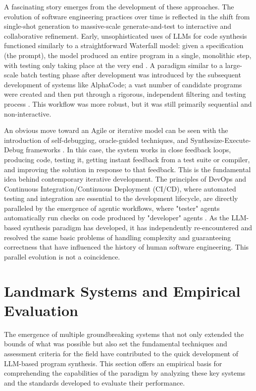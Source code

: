 \documentclass[12pt, a4paper]{report}
\begin{document}
A fascinating story emerges from the development of these approaches. The evolution of software engineering practices over time is reflected in the shift from single-shot generation to massive-scale generate-and-test to interactive and collaborative refinement. Early, unsophisticated uses of LLMs for code synthesis functioned similarly to a straightforward Waterfall model: given a specification (the prompt), the model produced an entire program in a single, monolithic step, with testing only taking place at the very end \citep{chen2021evaluating}. A paradigm similar to a large-scale batch testing phase after development was introduced by the subsequent development of systems like AlphaCode; a vast number of candidate programs were created and then put through a rigorous, independent filtering and testing process \citep{li2022competition}. This workflow was more robust, but it was still primarily sequential and non-interactive.

An obvious move toward an Agile or iterative model can be seen with the introduction of self-debugging, oracle-guided techniques, and Synthesize-Execute-Debug frameworks \citep{shinn2023reflexion}. In this case, the system works in close feedback loops, producing code, testing it, getting instant feedback from a test suite or compiler, and improving the solution in response to that feedback. This is the fundamental idea behind contemporary iterative development. The principles of DevOps and Continuous Integration/Continuous Deployment (CI/CD), where automated testing and integration are essential to the development lifecycle, are directly paralleled by the emergence of agentic workflows, where "tester" agents automatically run checks on code produced by "developer" agents \citep{zeng2024large}. As the LLM-based synthesis paradigm has developed, it has independently re-encountered and resolved the same basic problems of handling complexity and guaranteeing correctness that have influenced the history of human software engineering. This parallel evolution is not a coincidence.

\section{Landmark Systems and Empirical Evaluation}

The emergence of multiple groundbreaking systems that not only extended the bounds of what was possible but also set the fundamental techniques and assessment criteria for the field have contributed to the quick development of LLM-based program synthesis. This section offers an empirical basis for comprehending the capabilities of the paradigm by analyzing these key systems and the standards developed to evaluate their performance.
\end{document}

